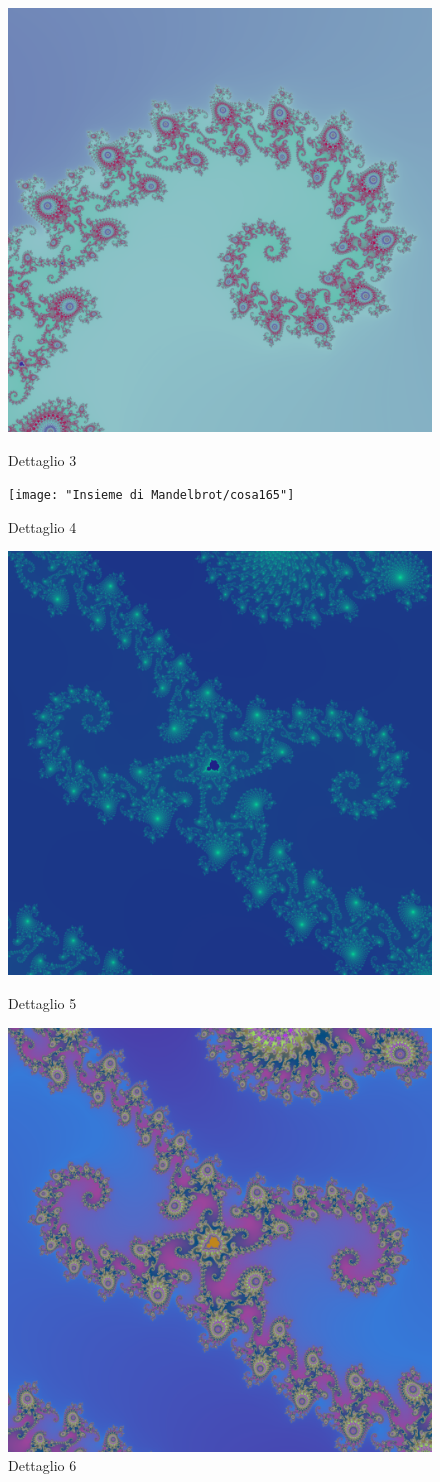 \documentclass[10pt]{report}
\begin{document}
				\begin{figure}[H]
					\centering
					\includegraphics[width=0.5\linewidth]{"Insieme di Mandelbrot/detail4"}
					\caption*{ \footnotesize{Dettaglio 3} }
					\label{fig:detail3}
					\endminipage \hfill
					\centering
					\texttt{[image: "Insieme di Mandelbrot/cosa165"]}
					\caption*{ \footnotesize{Dettaglio 4} }
					\label{fig:detail4}
					\endminipage \hfill
				\end{figure}
				\begin{figure}[H]
					\centering
					\includegraphics[width=0.5\linewidth]{"Insieme di Mandelbrot/detail6"}
					\caption*{ \footnotesize{Dettaglio 5} }
					\label{fig:detail5}
					\endminipage \hfill
					\centering
					\includegraphics[width=0.5\linewidth]{"Insieme di Mandelbrot/detail7"}
					\caption*{ \footnotesize{Dettaglio 6} }
					\label{fig:detail6}
					\endminipage \hfill
				\end{figure}
\end{document}
